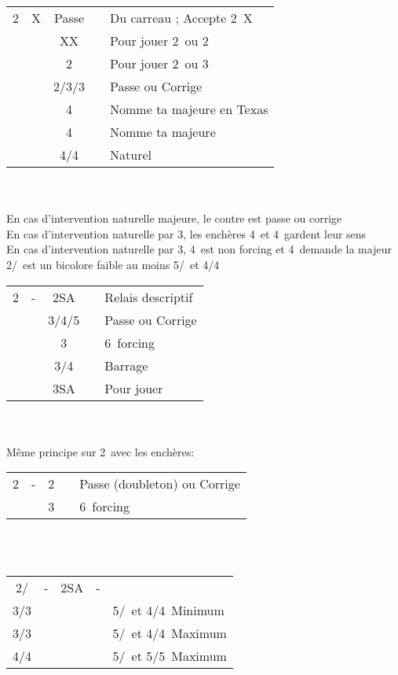 \documentclass[a4paper, oneside, 11pt]{report}
\begin{document}
	\begin{tabular}{cccc|l}
	2\carreau & X & Passe && Du carreau ; Accepte 2\carreau\ X\\
	&& XX && Pour jouer 2\coeur\ ou 2\pique\\
	&& 2\coeur && Pour jouer 2\coeur\ ou 3\pique\\
	&& 2\pique/3\coeur/3\pique && Passe ou Corrige\\
	&& 4\trefle && Nomme ta majeure en Texas\\
	&& 4\carreau && Nomme ta majeure\\
	&& 4\coeur/4\pique && Naturel\\
	\end{tabular}\\\\
	En cas d'intervention naturelle majeure, le contre est passe ou corrige\\	
	En cas d'intervention naturelle par 3\trefle, les enchères 4\trefle\ et 4\carreau\ gardent leur sens\\	
	En cas d'intervention naturelle par 3\carreau, 4\trefle\ est non forcing et 4\carreau\ demande la majeur\\

\newpage
	2\coeur/\pique\ est un bicolore faible au moins 5\coeur/\pique\ et 4\trefle/4\carreau\\

	\begin{tabular}{cccc|l}
	2\pique & - & 2SA && Relais descriptif\\
	&& 3\trefle/4\trefle/5\trefle && Passe ou Corrige\\
	&& 3\coeur && 6\coeur\ forcing\\
	&& 3\pique/4\pique && Barrage\\
	&& 3SA && Pour jouer\\
	\end{tabular}\\\\
	
	Même principe sur 2\coeur\ avec les enchères:
	\begin{tabular}{cccc|l}
	2\coeur & - & 2\pique && Passe (doubleton) ou Corrige\\
	&& 3\pique && 6\pique\ forcing\\
	\end{tabular}\\\\

	\begin{tabular}{cccc|l}
	2\coeur/\pique & - & 2SA & - &\\
	3\trefle/3\carreau &&&& 5\coeur/\pique\ et 4\trefle/4\carreau\ Minimum\\
	3\coeur/3\pique &&&& 5\coeur/\pique\ et 4\trefle/4\carreau\ Maximum\\
	4\trefle/4\carreau &&&& 5\coeur/\pique\ et 5\trefle/5\carreau\ Maximum\\
	\end{tabular}\\\\
	
\end{document}
